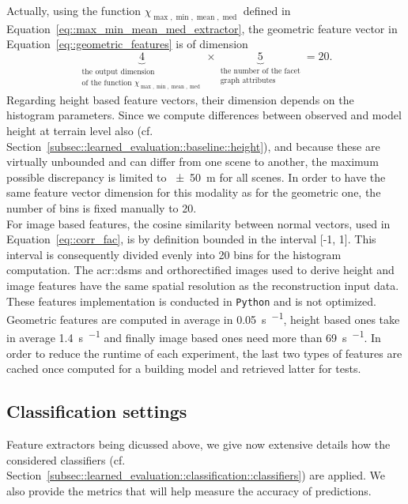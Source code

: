         Actually, using the function \(\chi_{\max,\min,\operatorname{mean},\operatorname{med}}\) defined in Equation~\ref{eq::max_min_mean_med_extractor}, the geometric feature vector in Equation~\ref{eq::geometric_features} is of dimension
        \begin{equation*}
            \underbrace{4}_{\substack{\text{the output dimension}\\\text{of the function } \chi_{\max,\min,\operatorname{mean},\operatorname{med}} }} \times \underbrace{5}_{\substack{\text{the number of the facet}\\\text{graph attributes}}} = 20.
        \end{equation*}
        Regarding height based feature vectors, their dimension depends on the histogram parameters.
        Since we compute differences between observed and model height at terrain level also (cf. Section~\ref{subsec::learned_evaluation::baseline::height}), and because these are virtually unbounded and can differ from one scene to another, the maximum possible discrepancy is limited to \SI{\pm 50}{\m} for all scenes.
        In order to have the same feature vector dimension for this modality as for the geometric one, the number of bins is fixed manually to \num{20}.\\
        For image based features, the cosine similarity between normal vectors, used in Equation~\ref{eq::corr_fac}, is by definition bounded in the interval [-1, 1].
        This interval is consequently divided evenly into \num{20} bins for the histogram computation.
        The \glspl{acr::dsm} and orthorectified images used to derive height and image features have the same spatial resolution as the reconstruction input data.\\

        These features implementation is conducted in \verb!Python! and is not optimized.
        Geometric features are computed in average in \SI{0.05}{\s \per \building}, height based ones take in average \SI{1.4}{\s \per \building} and finally image based ones need more than \SI{69}{\s \per \building}.
        In order to reduce the runtime of each experiment, the last two types of features are cached once computed for a building model and retrieved latter for tests.
    \subsection{Classification settings}
        \label{subsec::learned_evaluation::implementation::classification}
        Feature extractors being dicussed above, we give now extensive details how the considered classifiers (cf. Section~\ref{subsec::learned_evaluation::classification::classifiers}) are applied.
        We also provide the metrics that will help measure the accuracy of predictions.

